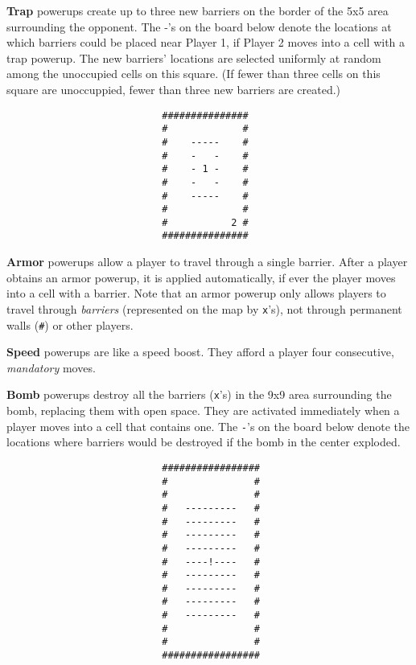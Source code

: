 \documentclass{article}
\newcommand{\amy}[1]{{\color{blue}[Amy: #1]}}
\begin{document}
\textbf{Trap} powerups create up to three new barriers on the border
of the 5x5 area surrounding the opponent.  The -'s on the board below
denote the locations at which barriers could be placed near Player 1,
if Player 2 moves into a cell with a trap powerup.  The new barriers'
locations are selected uniformly at random among the unoccupied cells
on this square.  (If fewer than three cells on this square are
unoccuppied, fewer than three new barriers are created.)

\begin{verbatim}
                           ###############
                           #             #
                           #    -----    #
                           #    -   -    #
                           #    - 1 -    #
                           #    -   -    #
                           #    -----    #
                           #             #
                           #           2 #
                           ###############
\end{verbatim}

\textbf{Armor} powerups allow a player to travel through a single
barrier.  After a player obtains an armor powerup, it is applied
automatically, if ever the player moves into a cell with a barrier.
Note that an armor powerup only allows players to travel through
\textit{barriers} (represented on the map by \texttt{x}'s), not
through permanent walls (\texttt{\#}) or other players.

\textbf{Speed} powerups are like a speed boost.  They afford a player
four consecutive, \emph{mandatory\/} moves.

\textbf{Bomb} powerups destroy all the barriers (\texttt{x}'s) in the
9x9 area surrounding the bomb, replacing them with open space.  They
are activated immediately when a player moves into a cell that
contains one.  The \texttt{-}'s on the board below denote the
locations where barriers would be destroyed if the bomb in the center
exploded.

\begin{centering}
\begin{verbatim}
                           #################
                           #               #
                           #               #
                           #   ---------   #
                           #   ---------   #
                           #   ---------   #
                           #   ---------   #
                           #   ----!----   #
                           #   ---------   #
                           #   ---------   #
                           #   ---------   #
                           #   ---------   #
                           #               #
                           #               #
                           #################
\end{verbatim}
\end{centering}
\end{document}

